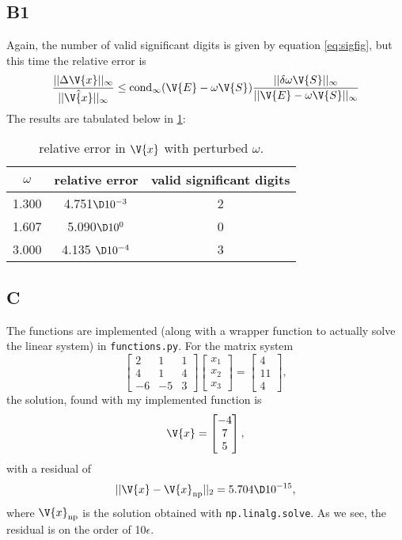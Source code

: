 \documentclass[a4paper,10pt]{article}
\begin{document}
	\subsection*{B1}
	Again, the number of valid significant digits is given by equation \ref{eq:sigfig}, but this time the relative error is
	\begin{equation}\label{key}
		\frac{||\Delta \V{x} ||_{\infty}}{||\hat{\V{x}} ||_{\infty}} \leq \text{cond}_{\infty} (\V{E} - \omega \V{S}) \frac{||\delta \omega \V{S}||_{\infty}}{||\V{E} - \omega \V{S}||_{\infty}}
	\end{equation}
	The results are tabulated below in \ref{tab:perturbed}:
	\begin{table}[H]
		\centering
		\begin{tabular}{c|c|c}
			$ \omega $ & relative error & valid significant digits \\
			\hline
			1.300 & 4.751$ \D 10^{-3} $ & 2\\
			1.607 & 5.090$ \D 10^0 $ & 0\\
			3.000 & 4.135 $ \D 10^{-4} $ & 3 
		\end{tabular}
		\caption{relative error in $ \V{x} $ with perturbed $ \omega $.}
		\label{tab:perturbed}
	\end{table}
	
	\subsection*{C}
	The functions are implemented (along with a wrapper function to actually solve the linear system) in \texttt{functions.py}. For the matrix system
	\begin{equation}\label{key}
		\begin{bmatrix}
		2 & 1 & 1 \\ 4 & 1 & 4 \\ -6 & -5 & 3
		\end{bmatrix} \begin{bmatrix}
		x_1 \\ x_2 \\ x_3
		\end{bmatrix} = \begin{bmatrix}
		4 \\ 11 \\ 4
		\end{bmatrix},
	\end{equation}
	the solution, found with my implemented function is
	\begin{equation}\label{key}
		\V{x} = \begin{bmatrix}
		-4 \\ 7 \\ 5
		\end{bmatrix},
	\end{equation}
	with a residual of
	\begin{equation}\label{key}
		||\V{x} - \V{x}_{\text{np}}||_2 = 5.704 \D 10^{-15},
	\end{equation}
	where $ \V{x}_{\text{np}} $ is the solution obtained with \texttt{np.linalg.solve}. As we see, the residual is on the order of 10$ \epsilon $.
	
\end{document}
